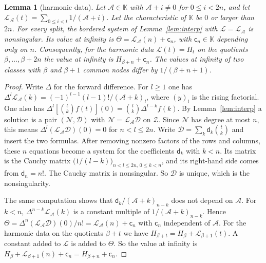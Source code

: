 \documentclass[11pt]{amsart}
\newtheorem{lemma}[theorem]{Lemma}
\theoremstyle{definition}
\theoremstyle{remark}
\numberwithin{equation}{section}
\begin{document}
\begin{lemma}[harmonic data]\label{lem:harmonic}
Let $\mathcal A\in\mathbb K$ with $\mathcal A+i\ne0$ for $0\le i<2n$, and let
$\mathcal L_{\mathcal A}(t)=\sum_{0\le i<t}1/(\mathcal A+i)$. Let the characteristic of $\mathbb K$ be $0$ or larger than
$2n$. For every split, the bordered system of Lemma~\ref{lem:interp} with $\mathcal L=\mathcal L_{\mathcal A}$ is
nonsingular. Its value at infinity is $\Theta=\mathcal L_{\mathcal A}(n)+\mathsf c_n$, with $\mathsf c_n\in\mathbb K$
depending only on $n$. Consequently, for the harmonic data $\mathcal L(t)=H_t$ on the quotients $\beta,\dots,\beta+2n$ the
value at infinity is $H_{\beta+n}+\mathsf c_n$. The values at infinity of two classes with $\beta$ and $\beta+1$ common nodes differ by
$1/(\beta+n+1)$.
\end{lemma}
\begin{proof}
Write $\Delta$ for the forward difference. For $l\ge1$ one has
$\Delta^l\mathcal L_{\mathcal A}(k)=(-1)^{l-1}(l-1)!/(\mathcal A+k)_l$, where $(y)_l$ is the rising factorial. One also
has $\Delta^l[\binom tk f(t)](0)=\binom lk\Delta^{l-k}f(k)$. By Lemma~\ref{lem:interp} a solution is a pair
$(\mathcal N,\mathcal D)$ with $\mathcal N=\mathcal L_{\mathcal A}\mathcal D$ on $\mathcal Z$. Since $\mathcal N$ has degree
at most $n$, this means $\Delta^l(\mathcal L_{\mathcal A}\mathcal D)(0)=0$ for $n<l\le2n$. Write
$\mathcal D=\sum_k\mathsf d_k\binom tk$ and insert the two formulas. After removing nonzero factors of the rows and
columns, these $n$ equations become a system for the coefficients $\mathsf d_k$ with $k<n$. Its matrix is the Cauchy
matrix $\bigl(1/(l-k)\bigr)_{n<l\le2n,\,0\le k<n}$, and its right-hand side comes from $\mathsf d_n=n!$. The Cauchy matrix
is nonsingular. So $\mathcal D$ is unique, which is the nonsingularity.

The same computation shows that $\mathsf d_k/(\mathcal A+k)_{n-k}$ does not depend on $\mathcal A$. For $k<n$,
$\Delta^{n-k}\mathcal L_{\mathcal A}(k)$ is a constant multiple of $1/(\mathcal A+k)_{n-k}$. Hence
$\Theta=\Delta^n(\mathcal L_{\mathcal A}\mathcal D)(0)/n!=\mathcal L_{\mathcal A}(n)+\mathsf c_n$ with
$\mathsf c_n$ independent of $\mathcal A$. For the harmonic data on the quotients $\beta+t$ we have
$H_{\beta+t}=H_\beta+\mathcal L_{\beta+1}(t)$. A constant added to $\mathcal L$ is added to $\Theta$. So the value at infinity is
$H_\beta+\mathcal L_{\beta+1}(n)+\mathsf c_n=H_{\beta+n}+\mathsf c_n$.
\end{proof}
\end{document}
